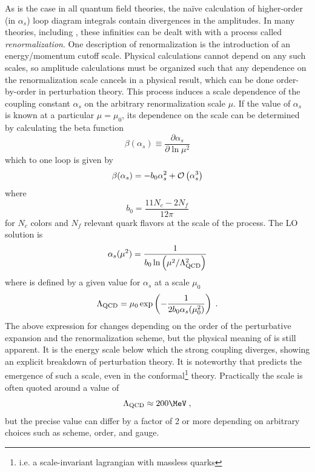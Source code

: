 
As is the case in all quantum field theories, the na\"ive calculation of higher-order (in $\alpha_s$) loop diagram integrals contain divergences in the amplitudes.
In many theories, including \qcd \cite{Gross:1973ju}, these infinities can be dealt with with a process called \emph{renormalization}.
One description of renormalization is the introduction of an energy/momentum cutoff scale.
Physical calculations cannot depend on any such scales, so amplitude calculations must be organized such that any dependence on the renormalization scale cancels in a physical result, which can be done order-by-order in perturbation theory.
This process induces a scale dependence of the coupling constant $\alpha_s$ on the arbitrary renormalization scale $\mu$.
If the value of $\alpha_s$ is known at a particular $\mu = \mu_0$, its dependence on the scale can be determined by calculating the beta function
\begin{equation}
  \beta(\alpha_s) \equiv  \frac{\partial \alpha_s}{\partial \ln \mu^2}
\end{equation}
which to one loop is given by \cite{Gross:1973id}
\begin{equation}
  \beta(\alpha_s) = -b_0 \alpha_s^2 + \mathcal{O}\left( \alpha_s^3 \right)
\end{equation}
where
\[
b_0 = \frac{11 N_c - 2 N_f}{12\pi}
\]
for $N_c$ colors and $N_f$ relevant quark flavors at the scale of the process.
The \ac{LO} solution is
\begin{equation}
  \alpha_s(\mu^2) = \frac{1}{b_0 \ln\left(\mu^2 / \Lambda_\textrm{QCD}^2\right)}
  \label{eq:running_as}
\end{equation}
where \lqcd is defined by a given value for $\alpha_s$ at a scale $\mu_0$
\[
\Lambda_\textrm{QCD} = \mu_0 \exp \left( -\frac{1}{2 b_0 \alpha_s(\mu_0^2)} \right) \; .
\]
The above expression for \lqcd changes depending on the order of the perturbative expansion and the renormalization scheme, but the physical meaning of \lqcd is still apparent.
It is the energy scale below which the strong coupling diverges, showing an explicit breakdown of perturbation theory.
It is noteworthy that \qcd predicts the emergence of such a scale, even in the conformal\footnote{i.e. a scale-invariant lagrangian with massless quarks} theory.
Practically the \qcd scale is often quoted around a value of %
\[
\lqcd \approx 200 \MeV \;,
\]
but the precise value can differ by a factor of 2 or more depending on arbitrary choices such as scheme, order, and gauge.


